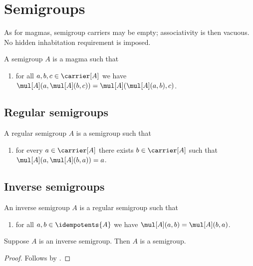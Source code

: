 

\section{Semigroups}

As for magmas, semigroup carriers may be empty; associativity is then
vacuous. No hidden inhabitation requirement is imposed.

\begin{struct}\label{semigroup}
    A semigroup $A$ is a magma such that
    \begin{enumerate}
        \item\label{semigroup_assoc}
            for all $a,b,c\in\carrier[A]$ we have
                $\mul[A](a,\mul[A](b,c))
                    =\mul[A](\mul[A](a,b),c)$.
    \end{enumerate}
\end{struct}

\subsection{Regular semigroups}

\begin{struct}\label{regularsemigroup}
    A regular semigroup $A$ is a semigroup such that
    \begin{enumerate}
        \item\label{regularsemigroup_regular}
            for every $a\in\carrier[A]$ there exists $b\in\carrier[A]$
                such that $\mul[A](a,\mul[A](b,a))=a$.
    \end{enumerate}
\end{struct}

\subsection{Inverse semigroups}

\begin{struct}\label{inversesemigroup}
    An inverse semigroup $A$ is a regular semigroup such that
    \begin{enumerate}
        \item\label{inversesemigroup_comm}
            for all $a,b\in\idempotents{A}$ we have
                $\mul[A](a,b)=\mul[A](b,a)$.
    \end{enumerate}
\end{struct}

\begin{proposition}\label{inversesemigroup_is_semigroup}
    Suppose $A$ is an inverse semigroup.
    Then $A$ is a semigroup.
\end{proposition}
\begin{proof}
    Follows by .
\end{proof}



